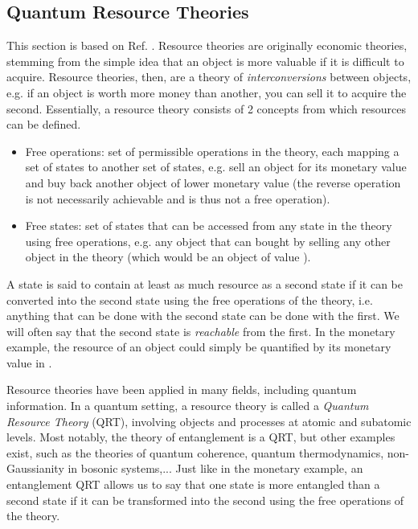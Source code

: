 \subsection{Quantum Resource Theories} \label{sec:QRT}

This section is based on Ref. \cite[pp. 2-13, 39-40]{chitambar_quantum_2019}. Resource theories are originally economic theories, stemming from the simple idea that an object is more valuable if it is difficult to acquire. Resource theories, then, are a theory of \textit{interconversions} between objects, e.g. if an object is worth more money than another, you can sell it to acquire the second. Essentially, a resource theory consists of 2 concepts from which resources can be defined.

\begin{itemize}
    \item Free operations: set of permissible operations in the theory, each mapping a set of states to another set of states, e.g. sell an object for its monetary value and buy back another object of lower monetary value (the reverse operation is not necessarily achievable and is thus not a free operation).
    \item Free states: set of states that can be accessed from any state in the theory using free operations, e.g. any object that can bought by selling any other object in the theory (which would be an object of value ).
\end{itemize}

A state is said to contain at least as much resource as a second state if it can be converted into the second state using the free operations of the theory, i.e. anything that can be done with the second state can be done with the first. We will often say that the second state is \textit{reachable} from the first. In the monetary example, the resource of an object could simply be quantified by its monetary value in \texteuro.

Resource theories have been applied in many fields, including quantum information. In a quantum setting, a resource theory is called a \textit{Quantum Resource Theory} (QRT), involving objects and processes at atomic and subatomic levels. %
Most notably, the theory of entanglement is a QRT, but other examples exist, such as the theories of quantum coherence, quantum thermodynamics, non-Gaussianity in bosonic systems,... Just like in the monetary example, an entanglement QRT allows us to say that one state is more entangled than a second state if it can be transformed into the second using the free operations of the theory.

